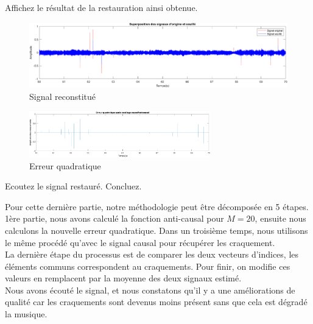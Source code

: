 \documentclass{article}
\begin{document}
Affichez le résultat de la restauration ainsi obtenue.

\begin{figure}[!h]
    \centering
    \includegraphics[width=1\textwidth]{images/partie6_signal.png}
    \caption{Signal reconstitué}
    \label{fig-binaire}
\end{figure}

\begin{figure}[!h]
    \centering
    \includegraphics[width=0.7\textwidth]{images/partie6_err_quad.png}
    \caption{Erreur quadratique}
    \label{fig-binaire}
\end{figure}

Ecoutez le signal restauré. Concluez.

Pour cette dernière partie, notre méthodologie peut être décomposée en 5 étapes. 1ère partie, nous avons calculé la fonction anti-causal pour $M=20$, ensuite nous calculons la nouvelle erreur quadratique. Dans un troisième temps, nous utilisons le même procédé qu'avec le signal causal pour récupérer les craquement.\\ 
La dernière étape du processus est de comparer les deux vecteurs d'indices, les éléments communs correspondent au craquements. 
Pour finir, on modifie ces valeurs en remplacent par la moyenne des deux signaux estimé.\\

Nous avons écouté le signal, et nous constatons qu'il y a une améliorations de qualité car les craquements sont devenus moins présent sans que cela est dégradé la musique.
\end{document}
